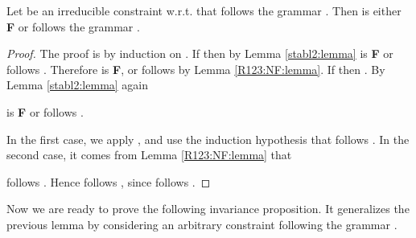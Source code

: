 \documentclass[submission,copyright,creativecommons]{eptcs}
\numberwithin{subcase}{case}
\begin{document}
\begin{lemma}
\label{invariance:next:lemma}
Let   
be an irreducible constraint
w.r.t.  that follows the grammar .
Then   
is either \textbf{F} or follows the grammar .
\end{lemma}
\begin{proof}
The proof is by induction on . If  then by Lemma \ref{stabl2:lemma}
 is \textbf{F} or
follows  . Therefore  is 
\textbf{F}, or  follows   by Lemma \ref{R123:NF:lemma}. If 
then .
 By  Lemma \ref{stabl2:lemma} again 

  is \textbf{F} or follows . 
  
  In the first case, we apply
  , and use the
  induction hypothesis that  follows .  In the second case, it
comes from Lemma \ref{R123:NF:lemma} that
 
follows . Hence  follows , since
 follows .
\end{proof}

Now we are ready to prove the following invariance proposition. It generalizes
the previous lemma by considering an arbitrary constraint following the grammar
.
\end{document}
